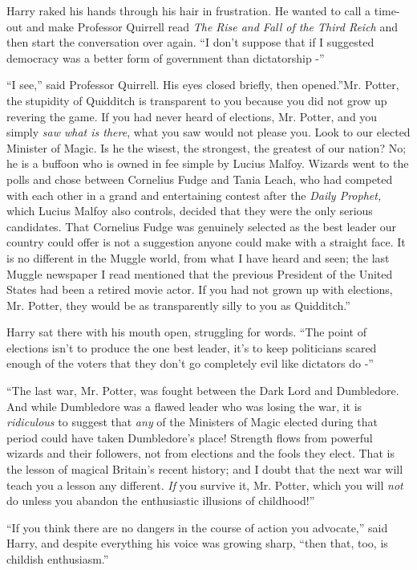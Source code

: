 Harry raked his hands through his hair in frustration. He wanted to call
a time-out and make Professor Quirrell read \emph{The Rise and Fall of
the Third Reich} and then start the conversation over again. ``I don't
suppose that if I suggested democracy was a better form of government
than dictatorship -''

``I see,'' said Professor Quirrell. His eyes closed briefly, then
opened.''Mr. Potter, the stupidity of Quidditch is transparent to you
because you did not grow up revering the game. If you had never heard of
elections, Mr. Potter, and you simply \emph{saw what is there}, what you
saw would not please you. Look to our elected Minister of Magic. Is he
the wisest, the strongest, the greatest of our nation? No; he is a
buffoon who is owned in fee simple by Lucius Malfoy. Wizards went to the
polls and chose between Cornelius Fudge and Tania Leach, who had
competed with each other in a grand and entertaining contest after the
\emph{Daily Prophet,} which Lucius Malfoy also controls, decided that
they were the only serious candidates. That Cornelius Fudge was
genuinely selected as the best leader our country could offer is not a
suggestion anyone could make with a straight face. It is no different in
the Muggle world, from what I have heard and seen; the last Muggle
newspaper I read mentioned that the previous President of the United
States had been a retired movie actor. If you had not grown up with
elections, Mr. Potter, they would be as transparently silly to you as
Quidditch.''

Harry sat there with his mouth open, struggling for words. ``The point
of elections isn't to produce the one best leader, it's to keep
politicians scared enough of the voters that they don't go completely
evil like dictators do -''

``The last war, Mr. Potter, was fought between the Dark Lord and
Dumbledore. And while Dumbledore was a flawed leader who was losing the
war, it is \emph{ridiculous} to suggest that \emph{any} of the Ministers
of Magic elected during that period could have taken Dumbledore's place!
Strength flows from powerful wizards and their followers, not from
elections and the fools they elect. That is the lesson of magical
Britain's recent history; and I doubt that the next war will teach you a
lesson any different. \emph{If} you survive it, Mr. Potter, which you
will \emph{not} do unless you abandon the enthusiastic illusions of
childhood!''

``If you think there are no dangers in the course of action you
advocate,'' said Harry, and despite everything his voice was growing
sharp, ``then that, too, is childish enthusiasm.''

